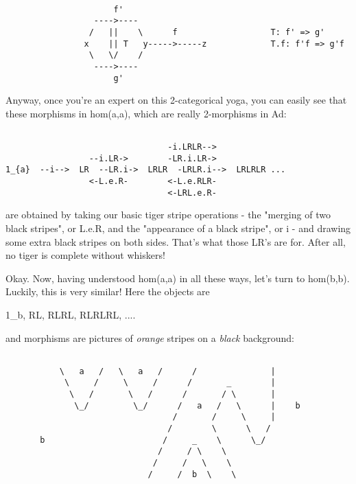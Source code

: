 \begin{verbatim}

                      f'           
                  ---->----   
                 /   ||    \      f                   T: f' => g'
                x    || T   y----->-----z             T.f: f'f => g'f
                 \   \/    /
                  ---->---- 
                      g'     
\end{verbatim}
    
Anyway, once you're an expert on this 2-categorical yoga, you can
easily see that these morphisms in hom(a,a), which are really 2-morphisms
in Ad:


\begin{verbatim}

                                 -i.LRLR-->
                 --i.LR->        -LR.i.LR->
1_{a}  --i-->  LR  --LR.i->  LRLR  -LRLR.i-->  LRLRLR ...
                 <-L.e.R-        <-L.e.RLR-
                                 <-LRL.e.R-

\end{verbatim}
    
are obtained by taking our basic tiger stripe operations - the
"merging of two black stripes", or L.e.R, and the
"appearance of a black stripe", or i - and drawing some extra
black stripes on both sides.  That's what those LR's are for.  After
all, no tiger is complete without whiskers!

Okay.  Now, having understood hom(a,a) in all these ways, let's turn
to hom(b,b).  Luckily, this is very similar!  Here the objects are

1_{b}, RL, RLRL, RLRLRL, ....

and morphisms are pictures of \emph{orange} stripes on a
\emph{black} background:


\begin{verbatim}

           \   a   /   \   a   /      /               |
            \     /     \     /      /       _        |
             \   /       \   /      /       / \       |
              \_/         \_/      /   a   /   \      |    b
                                  /       /     \     |
                                 /        \      \   / 
       b                        /     _    \      \_/ 
                               /     / \    \      
                              /     /   \    \       
                             /     /  b  \    \  
\end{verbatim}
    
